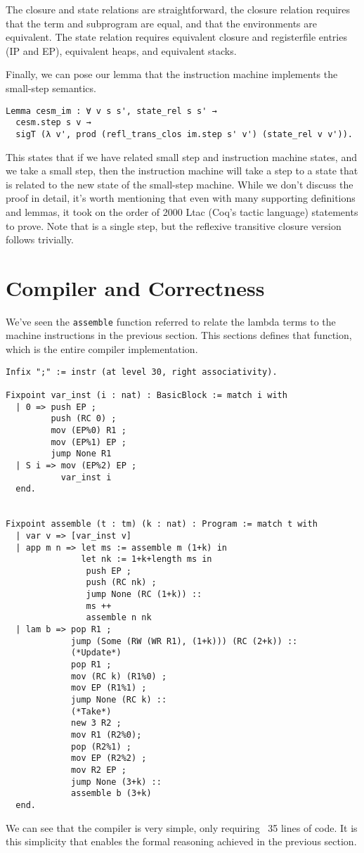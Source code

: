 The closure and state relations are straightforward, the closure relation
requires that the term and subprogram are equal, and that the environments are
equivalent. The state relation requires equivalent closure and registerfile
entries (IP and EP), equivalent heaps, and equivalent stacks.

Finally, we can pose our lemma that the instruction machine implements the
small-step semantics.

\begin{verbatim}
Lemma cesm_im : ∀ v s s', state_rel s s' → 
  cesm.step s v → 
  sigT (λ v', prod (refl_trans_clos im.step s' v') (state_rel v v')).
\end{verbatim}
This states that if we have related small step and instruction machine states,
and we take a small step, then the instruction machine will take a step to a
state that is related to the new state of the small-step machine.  While we
don't discuss the proof in detail, it's worth mentioning that even with many
supporting definitions and lemmas, it took on the order of 2000 Ltac (Coq's
tactic language) statements to prove. Note that is a single step, but the
reflexive transitive closure version follows trivially. 

\section{Compiler and Correctness}

We've seen the \texttt{assemble} function referred to relate the lambda terms to
the machine instructions in the previous section. This sections defines that
function, which is the entire compiler implementation.

\begin{verbatim}
Infix ";" := instr (at level 30, right associativity).

Fixpoint var_inst (i : nat) : BasicBlock := match i with
  | 0 => push EP ;
         push (RC 0) ;
         mov (EP%0) R1 ;
         mov (EP%1) EP ;
         jump None R1
  | S i => mov (EP%2) EP ; 
           var_inst i
  end.


Fixpoint assemble (t : tm) (k : nat) : Program := match t with  
  | var v => [var_inst v]
  | app m n => let ms := assemble m (1+k) in
               let nk := 1+k+length ms in
                push EP ;
                push (RC nk) ;
                jump None (RC (1+k)) :: 
                ms ++ 
                assemble n nk
  | lam b => pop R1 ;
             jump (Some (RW (WR R1), (1+k))) (RC (2+k)) ::
             (*Update*)
             pop R1 ;  
             mov (RC k) (R1%0) ;
             mov EP (R1%1) ;
             jump None (RC k) ::
             (*Take*)
             new 3 R2 ;
             mov R1 (R2%0);
             pop (R2%1) ;
             mov EP (R2%2) ;
             mov R2 EP ;
             jump None (3+k) :: 
             assemble b (3+k)
  end. 
\end{verbatim}
We can see that the compiler is very simple, only requiring ~35 lines of code.
It is this simplicity that enables the formal reasoning achieved in the previous
section. 

